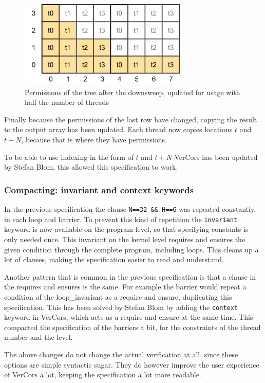 \documentclass[a4paper]{article}
\newcommand{\code}[1]{\texttt{\small \color{inline}#1}} %
\begin{document}
\begin{figure}[htb!]
	\centering
	\includegraphics[width=80mm]{../images/tree-permissions-end-halfthreads-v1.png}
	\caption{Permissions of the tree after the downsweep, updated for usage with half the number of threads}
	\label{fig:treeArrayPermissionsEndHalfThreads}
\end{figure}
\FloatBarrier

Finally because the permissions of the last row have changed, copying the result to the output array has been updated. Each thread now copies locations $t$ and $t+N$, because that is where they have permissions.

To be able to use indexing in the form of $t$ and $t+N$ VerCors has been updated by Stefan Blom, this allowed this specification to work.

\subsubsection{Compacting: invariant and context keywords}
In the previous specification the clause \code{N==32 \&\& H==6} was repeated constantly, in each loop and barrier. To prevent this kind of repetition the \code{invariant} keyword is now available on the program level, so that specifying constants is only needed once. This invariant on the kernel level requires and ensures the given condition through the complete program, including loops. This cleans up a lot of clauses, making the specification easier to read and understand.

Another pattern that is common in the previous specification is that a clause in the requires and ensures is the same. For example the barrier would repeat a condition of the loop\_invariant as a require and ensure, duplicating this specification. This has been solved by Stefan Blom by adding the \code{context} keyword in VerCors, which acts as a require and ensure at the same time. This compacted the specification of the barriers a bit, for the constraints of the thread number and the level.

The above changes do not change the actual verification at all, since these options are simple syntactic sugar. They do however improve the user experience of VerCors a lot, keeping the specification a lot more readable.
\end{document}
